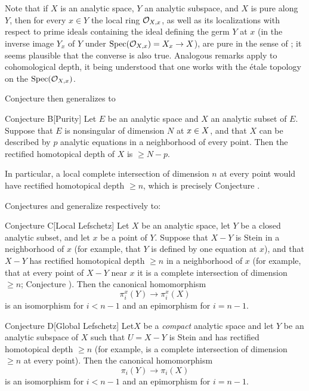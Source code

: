 Note that if $X$ is an analytic space, $Y$ an analytic subspace, and $X$ is pure along $Y$, then for every $x\in Y$ the local ring $\mathcal O_{X,x}$, as well as its localizations with respect to prime ideals containing the ideal defining the germ $Y$ at $x$ (\ie in the inverse image $Y_x$ of $Y$ under $\operatorname{Spec}(\mathcal O_{X,x})=X_x\to X$), are pure in the sense of \Exp {}; it seems plausible that the converse is also true. Analogous remarks apply to cohomological depth, it being understood that one works with the \'etale topology on the $\operatorname{Spec}(\mathcal O_{X,x})$.

Conjecture  then generalizes to

 \label{XIII.6.B}
\begin{enonce*}{Conjecture B}[\og Purity\fg]
Let $E$ be an analytic space and $X$ an analytic subset of $E$. Suppose that $E$ is nonsingular of dimension $N$ at $x\in X$, and that $X$ can be described by $p$ analytic equations in a neighborhood of every point. Then the rectified homotopical depth of $X$ is $\geq N-p$.
\end{enonce*}

In particular, a local complete intersection of dimension $n$ at every point would have rectified homotopical depth $\geq n$, which is precisely Conjecture .

Conjectures  and  generalize respectively to:

 \label{XIII.6.C}
\begin{enonce*}{Conjecture C}[\og Local Lefschetz\fg]
Let $X$ be an analytic space, let $Y$ be a closed analytic subset, and let $x$ be a point of $Y$. Suppose that $X-Y$ is Stein in a neighborhood of $x$ (for example, that $Y$ is defined by one equation at $x$), and that $X-Y$ has rectified homotopical depth $\geq n$ in a neighborhood of $x$ (for example, that at every point of $X-Y$ near $x$ it is a complete intersection of dimension $\geq n$; \cf Conjecture ). Then the canonical homomorphism
$$
\pi_i^x(Y)\to\pi_i^x(X)
$$
is an isomorphism for $i<n-1$ and an epimorphism for $i=n-1$.
\end{enonce*}

 \label{XIII.6.D}
\begin{enonce*}{Conjecture D}[\og Global Lefschetz\fg]
Let\pageoriginaled $X$ be a \emph{compact} analytic space and let $Y$ be an analytic subspace of $X$ such that $U=X-Y$ is Stein and has rectified homotopical depth $\geq n$ (for example, is a complete intersection of dimension $\geq n$ at every point). Then the canonical homomorphism
$$
\pi_i(Y)\to\pi_i(X)
$$
is an isomorphism for $i<n-1$ and an epimorphism for $i=n-1$.
\end{enonce*}

